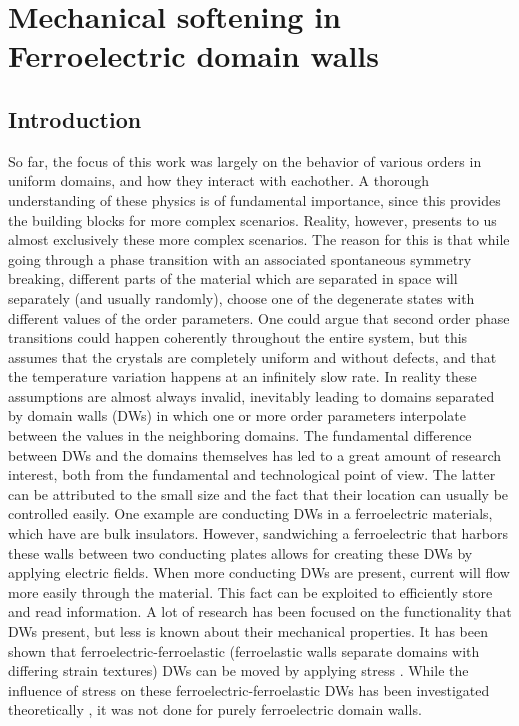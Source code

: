 \chapter{Mechanical softening in Ferroelectric domain walls}


\section{Introduction}
So far, the focus of this work was largely on the behavior of various orders in uniform domains, and how they interact with eachother.
A thorough understanding of these physics is of fundamental importance, since this provides the building blocks for more complex scenarios.
Reality, however, presents to us almost exclusively these more complex scenarios.
The reason for this is that while going through a phase transition with an associated spontaneous symmetry breaking, different parts of the material which are separated in space will separately (and usually randomly), choose one of the degenerate states with different values of the order parameters.
One could argue that second order phase transitions could happen coherently throughout the entire system, but this assumes that the crystals are completely uniform and without defects, and that the temperature variation happens at an infinitely slow rate.
In reality these assumptions are almost always invalid, inevitably leading to domains separated by domain walls (DWs) in which one or more order parameters interpolate between the values in the neighboring domains.
The fundamental difference between DWs and the domains themselves has led to a great amount of research interest, both from the fundamental and technological point of view.
The latter can be attributed to the small size and the fact that their location can usually be controlled easily.
One example are conducting DWs in a ferroelectric materials, which have are bulk insulators.
However, sandwiching a ferroelectric that harbors these walls between two conducting plates allows for creating these DWs by applying electric fields.
When more conducting DWs are present, current will flow more easily through the material.
This fact can be exploited to efficiently store and read information.
A lot of research has been focused on the functionality that DWs present, but less is known about their mechanical properties.
It has been shown that ferroelectric-ferroelastic (ferroelastic walls separate domains with differing strain textures) DWs can be moved by applying stress \cite{Schneider2001}.
While the influence of stress on these ferroelectric-ferroelastic DWs has been investigated theoretically \cite{Lee2003}, it was not done for purely ferroelectric domain walls.

